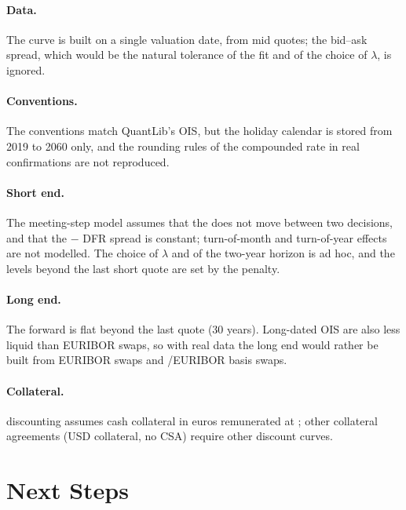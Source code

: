 \documentclass[11pt,a4paper]{article}
\theoremstyle{plain}
\theoremstyle{definition}
\newcommand{\estr}{\text{\texteuro STR}}
\begin{document}
\paragraph{Data.} The curve is built on a single valuation date, from mid quotes; the bid--ask spread, which would be the natural tolerance of the fit and of the choice of $\lambda$, is ignored.

\paragraph{Conventions.} The conventions match QuantLib's \estr{} OIS, but the holiday calendar is stored from 2019 to 2060 only, and the rounding rules of the compounded rate in real confirmations are not reproduced.

\paragraph{Short end.} The meeting-step model assumes that the \estr{} does not move between two decisions, and that the \estr{} $-$ DFR spread is constant; turn-of-month and turn-of-year effects are not modelled. The choice of $\lambda$ and of the two-year horizon is ad hoc, and the levels beyond the last short quote are set by the penalty.

\paragraph{Long end.} The forward is flat beyond the last quote (30 years). Long-dated \estr{} OIS are also less liquid than EURIBOR swaps, so with real data the long end would rather be built from EURIBOR swaps and \estr{}/EURIBOR basis swaps.

\paragraph{Collateral.} \estr{} discounting assumes cash collateral in euros remunerated at \estr{}; other collateral agreements (USD collateral, no CSA) require other discount curves.

\section{Next Steps}
\label{sec:next-steps}
\end{document}

